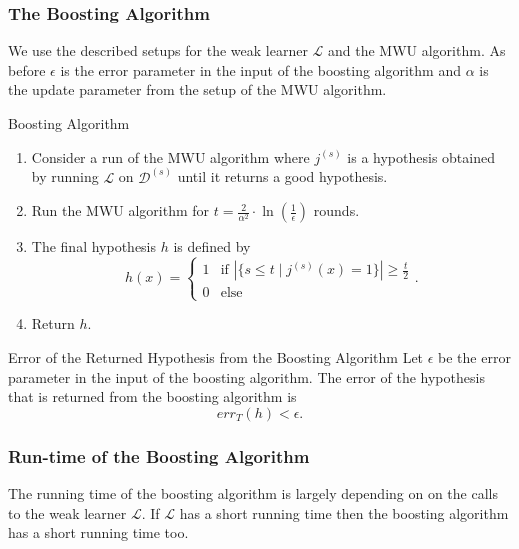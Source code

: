 \documentclass{panikzettel}
\begin{document}
\subsubsection{The Boosting Algorithm}
We use the described setups for the weak learner $\mathcal{L}$ and the MWU algorithm. As before $\epsilon$ is the error parameter in the input of the boosting algorithm and $\alpha$ is the update parameter from the setup of the MWU algorithm.

\begin{halfboxl}
\vspace{-\baselineskip}
\begin{algo}{Boosting Algorithm}
\begin{enumerate}
\item Consider a run of the MWU algorithm where $j^{(s)}$ is a hypothesis obtained by running $\mathcal{L}$ on $\mathcal{D}^{(s)}$ until it returns a good hypothesis.
\item Run the MWU algorithm for $t=\frac{2}{\alpha^2}\cdot \ln(\frac{1}{\epsilon})$ rounds.
\item The final hypothesis $h$ is defined by
\[
h(x)=
\begin{cases}
1 & \text{if } |\{s\leq t\mid j^{(s)}(x)=1 \}|\geq \frac{t}{2}\\
0 & \text{else}
\end{cases}
.
\]
\item Return $h$.
\end{enumerate}
\end{algo}

\end{halfboxl}
\begin{halfboxr}
\vspace{-\baselineskip}
\begin{theo}{Error of the Returned Hypothesis from the Boosting Algorithm}
Let $\epsilon$ be the error parameter in the input of the boosting algorithm. The error of the hypothesis that is returned from the boosting algorithm is
\[
err_T(h)<\epsilon.
\]
\end{theo}
\end{halfboxr}

\subsubsection{Run-time of the Boosting Algorithm}
The running time of the boosting algorithm is largely depending on on the calls to the weak learner $\mathcal{L}$. If $\mathcal{L}$ has a short running time then the boosting algorithm has a short running time too.
\end{document}
